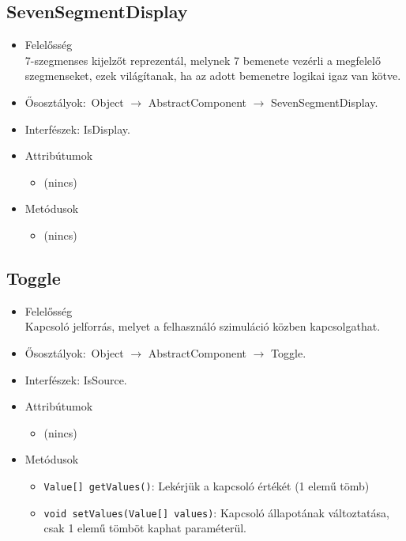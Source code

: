 \subsection{SevenSegmentDisplay}
\begin{itemize}
\item Felelősség\\
7-szegmenses kijelzőt reprezentál, melynek 7 bemenete vezérli a  megfelelő szegmenseket, ezek világítanak, ha az adott bemenetre logikai  igaz van kötve.
\item Ősosztályok:\ Object $\rightarrow{}$ AbstractComponent $\rightarrow{}$ SevenSegmentDisplay.
\item Interfészek: IsDisplay.
\item Attribútumok $\ $
\begin{itemize}
\item (nincs)
\end{itemize}
\item Metódusok$\ $
\begin{itemize}
\item (nincs)
\end{itemize}
\end{itemize}

\subsection{Toggle}
\begin{itemize}
\item Felelősség\\
Kapcsoló jelforrás, melyet a felhasználó szimuláció közben kapcsolgathat.
\item Ősosztályok:\ Object $\rightarrow{}$ AbstractComponent $\rightarrow{}$ Toggle.
\item Interfészek: IsSource.
\item Attribútumok $\ $
\begin{itemize}
\item (nincs)
\end{itemize}
\item Metódusok$\ $
\begin{itemize}
	\item \texttt{Value[] getValues()}: Lekérjük a kapcsoló értékét (1 elemű tömb)
	\item \texttt{void setValues(Value[] values)}: Kapcsoló állapotának változtatása, csak 1 elemű tömböt kaphat paraméterül.
\end{itemize}
\end{itemize}

